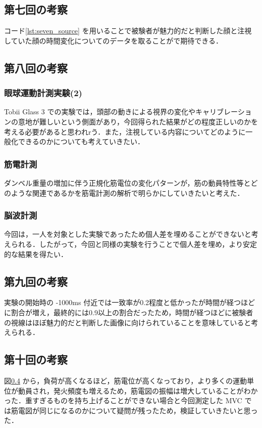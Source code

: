 \documentclass[dvipdfmx, titlepage, t]{jsarticle}
\begin{document}
    \subsection{第七回の考察}
    コード\ref{lst:seven_source} を用いることで被験者が魅力的だと判断した顔と注視していた顔の時間変化についてのデータを取ることがで期待できる．

    \subsection{第八回の考察}
    \subsubsection{眼球運動計測実験(2)}
        Tobii Glass 3 での実験では，頭部の動きによる視界の変化やキャリブレーションの意地が難しいという側面があり，今回得られた結果がどの程度正しいのかを考える必要があると思われrう．また，注視している内容についてどのように一般化できるのかについても考えていきたい．

    \subsubsection{筋電計測}
    ダンベル重量の増加に伴う正規化筋電位の変化パターンが，筋の動員特性等とどのような関連であるかを筋電計測の解析で明らかにしていきたいと考えた．

    \subsubsection{脳波計測}
    今回は，一人を対象とした実験であったため個人差を埋めることができないと考えられる．したがって，今回と同様の実験を行うことで個人差を埋め，より安定的な結果を得たい．
    
    \subsection{第九回の考察}
    実験の開始時の -1000ms 付近では一致率が0.2程度と低かったが時間が経つほどに割合が増え，最終的には0.9以上の割合だったため，時間が経つほどに被験者の視線はほぼ魅力的だと判断した画像に向けられていることを意味していると考えられる．
    
    \subsection{第十回の考察}
    図\ref{} から，負荷が高くなるほど，筋電位が高くなっており，より多くの運動単位が動員され，発火頻度も増えるため，筋電図の振幅は増大していることがわかった．重すぎるものを持ち上げることができない場合と今回測定した MVC では筋電図が同じになるのかについて疑問が残ったため，検証していきたいと思った．
\end{document}
